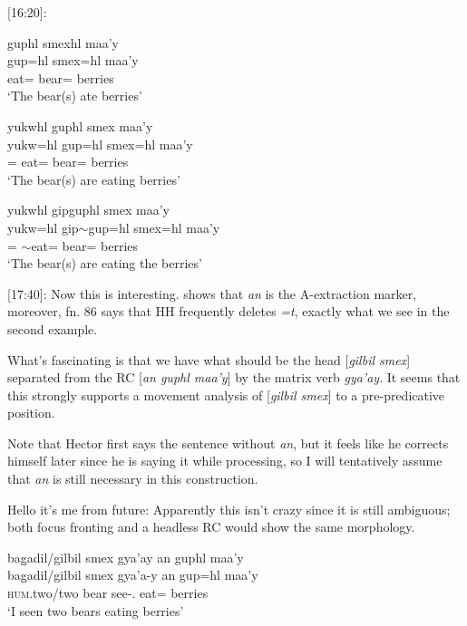 [16:20]:
\begin{exe}
    \ex \begin{xlist}
    \item \glll guphl smexhl maa'y\\
    gup=hl smex=hl maa'y  \\
    eat=\Cn{} bear=\Cn{} berries \\
    `The bear(s) ate berries'

    \item \glll yukwhl guphl smex maa'y\\
    yukw=hl gup=hl smex=hl maa'y  \\
    \Prog{}=\Cn{} eat=\Cn{} bear=\Cn{} berries \\
    `The bear(s) are eating berries'

    \item \glll yukwhl gipguphl smex maa'y\\
    yukw=hl gip$\sim$gup=hl smex=hl maa'y  \\
    \Prog{}=\Cn{} \Pl{}$\sim$eat=\Cn{} bear=\Cn{} berries \\
    `The bear(s) are eating the berries'
    \end{xlist}
\end{exe}

[17:40]: Now this is interesting. \textcite[80]{davisMorphosyntaxGitksan2026} shows that \textit{an} is the A-extraction marker, moreover, fn. 86 says that HH frequently deletes \textit{=t}, exactly what we see in the second example. 

What's fascinating is that we have what should be the head [\textit{gilbil smex}] separated from the RC [\textit{an guphl maa'y}] by the matrix verb \textit{gya'ay}. It seems that this strongly supports a movement analysis of [\textit{gilbil smex}] to a pre-predicative position.

Note that Hector first says the sentence without \textit{an}, but it feels like he corrects himself later since he is saying it while processing, so I will tentatively assume that \textit{an} is still necessary in this construction.

Hello it's me from future: Apparently this isn't crazy since it is still ambiguous; both focus fronting and a headless RC would show the same morphology. 

\begin{exe}
    \ex \glll bag̱adil/gilbil smex gya'ay an guphl maa'y \\
    bag̱adil/gilbil smex gya'a-y an gup=hl maa'y \\
    \textsc{hum}.two/two bear see-\Ssg{}.\Ii{} \Ax{} eat=\Cn{} berries \\
    `I seen two bears eating berries'
\end{exe}

